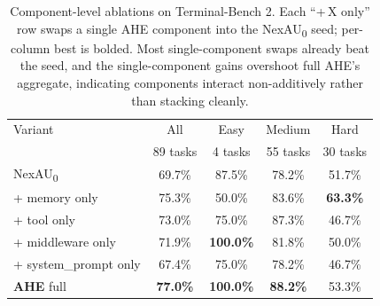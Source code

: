 \begin{table}[htbp]
    \centering
    \small
     \vspace{\baselineskip}
    \caption{Component-level ablations on Terminal-Bench 2. Each ``+\,X only'' row swaps a single AHE component into the NexAU\textsubscript{0} seed; per-column best is bolded. Most single-component swaps already beat the seed, and the single-component gains overshoot full AHE's aggregate, indicating components interact non-additively rather than stacking cleanly.}
    \label{tab:ablations}
    \begin{tabular}{lcccc}
        \toprule
        Variant & All & Easy & Medium & Hard \\
                & {\scriptsize 89 tasks} & {\scriptsize 4 tasks} & {\scriptsize 55 tasks} & {\scriptsize 30 tasks} \\
        \midrule
        NexAU\textsubscript{0} & 69.7\% & 87.5\% & 78.2\% & 51.7\% \\
        \addlinespace
        + memory only         & 75.3\% & 50.0\% & 83.6\% & \textbf{63.3\%} \\
        + tool only           & 73.0\% & 75.0\% & 87.3\% & 46.7\% \\
        + middleware only     & 71.9\% & \textbf{100.0\%} & 81.8\% & 50.0\% \\
        + system\_prompt only & 67.4\% & 75.0\% & 78.2\% & 46.7\% \\
        \addlinespace
        \textbf{AHE} full     & \textbf{77.0\%} & \textbf{100.0\%} & \textbf{88.2\%} & 53.3\% \\
        \bottomrule
    \end{tabular}
\end{table}
